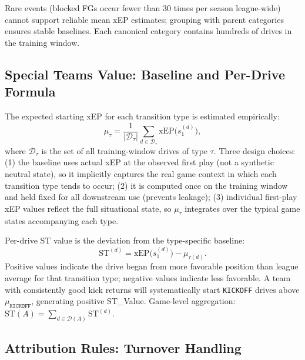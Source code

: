 \documentclass[12pt,a4paper]{article}
\begin{document}
Rare events (blocked FGs occur fewer than 30 times per season league-wide) cannot support reliable mean xEP estimates; grouping with parent categories ensures stable baselines. Each canonical category contains hundreds of drives in the training window.

\subsection{Special Teams Value: Baseline and Per-Drive Formula}

The expected starting xEP for each transition type is estimated empirically:
\begin{equation}
  \label{eq:st-baseline}
  \mu_{\tau} = \frac{1}{|\mathcal{D}_{\tau}|} \sum_{d \in \mathcal{D}_{\tau}} \mathrm{xEP}\!\bigl(s_1^{(d)}\bigr),
\end{equation}
where $\mathcal{D}_{\tau}$ is the set of all training-window drives of type $\tau$. Three design choices: (1) the baseline uses actual xEP at the observed first play (not a synthetic neutral state), so it implicitly captures the real game context in which each transition type tends to occur; (2) it is computed once on the training window and held fixed for all downstream use (prevents leakage); (3) individual first-play xEP values reflect the full situational state, so $\mu_{\tau}$ integrates over the typical game states accompanying each type.

Per-drive ST value is the deviation from the type-specific baseline:
\begin{equation}
  \label{eq:st-drive}
  \mathrm{ST}^{(d)} = \mathrm{xEP}\!\bigl(s_1^{(d)}\bigr) - \mu_{\tau(d)}.
\end{equation}
Positive values indicate the drive began from more favorable position than league average for that transition type; negative values indicate less favorable. A team with consistently good kick returns will systematically start \texttt{KICKOFF} drives above $\mu_{\texttt{KICKOFF}}$, generating positive ST\_Value. Game-level aggregation: $\mathrm{ST}(A) = \sum_{d \in \mathcal{D}(A)} \mathrm{ST}^{(d)}$.

\subsection{Attribution Rules: Turnover Handling}
\end{document}

